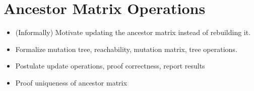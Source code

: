 \section{Ancestor Matrix Operations}

\begin{itemize}
    \item (Informally) Motivate updating the ancestor matrix instead of rebuilding it.
    \item Formalize mutation tree, reachability, mutation matrix, tree operations.
    \item Postulate update operations, proof correctness, report results
    \item Proof uniqueness of ancestor matrix
\end{itemize}